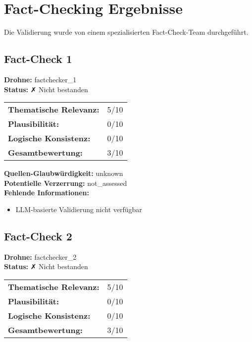 \documentclass[12pt,a4paper]{article}
\begin{document}
\newpage
\section{Fact-Checking Ergebnisse}

Die Validierung wurde von einem spezialisierten Fact-Check-Team durchgeführt.


\subsection{Fact-Check 1}

\textbf{Drohne:} factchecker\_1\\
\textbf{Status:} ✗ Nicht bestanden\\

\begin{tabular}{ll}
\textbf{Thematische Relevanz:} & 5/10 \\
\textbf{Plausibilität:} & 0/10 \\
\textbf{Logische Konsistenz:} & 0/10 \\
\textbf{Gesamtbewertung:} & 3/10 \\
\end{tabular}

\textbf{Quellen-Glaubwürdigkeit:} unknown\\
\textbf{Potentielle Verzerrung:} not\_assessed\\
\textbf{Fehlende Informationen:}
\begin{itemize}
\item LLM-basierte Validierung nicht verfügbar
\end{itemize}

\subsection{Fact-Check 2}

\textbf{Drohne:} factchecker\_2\\
\textbf{Status:} ✗ Nicht bestanden\\

\begin{tabular}{ll}
\textbf{Thematische Relevanz:} & 5/10 \\
\textbf{Plausibilität:} & 0/10 \\
\textbf{Logische Konsistenz:} & 0/10 \\
\textbf{Gesamtbewertung:} & 3/10 \\
\end{tabular}
\end{document}
